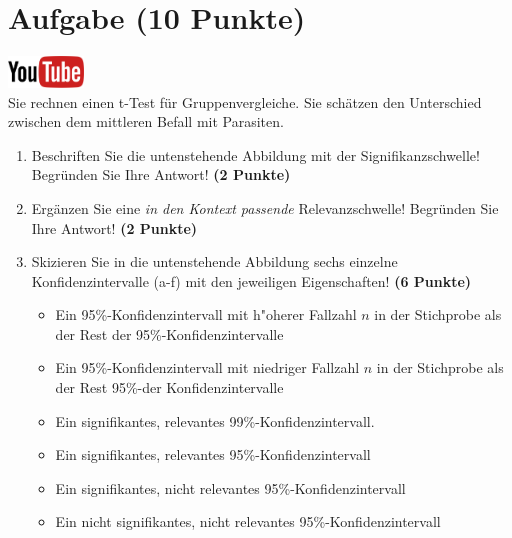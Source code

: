 \documentclass[a4paper, 10pt]{scrartcl}\usepackage[]{graphicx}\usepackage[]{xcolor}
\begin{document}
 
\clearpage

\section{Aufgabe \hfill (10 Punkte)}

\hfill\href{https://youtu.be/CN_O4fYPbhs}{\includegraphics[width =
  2cm]{img/youtube}}\\[1Ex]



Sie rechnen einen t-Test f{\"u}r Gruppenvergleiche. Sie sch{\"a}tzen den Unterschied
zwischen dem mittleren Befall mit Parasiten. 

\begin{enumerate}
\item Beschriften Sie die untenstehende Abbildung mit der
  Signifikanzschwelle! Begr{\"u}nden Sie Ihre Antwort! \textbf{(2 Punkte)}
\item Erg{\"a}nzen Sie eine \textit{in den Kontext passende} Relevanzschwelle!
  Begr{\"u}nden Sie Ihre Antwort! \textbf{(2 Punkte)} 
\item Skizieren Sie in die
  untenstehende Abbildung sechs einzelne Konfidenzintervalle (a-f) mit den
  jeweiligen Eigenschaften! \textbf{(6 Punkte)}
  \begin{itemize}
  \item[(a)] Ein 95\%-Konfidenzintervall mit h{"o}herer Fallzahl $n$ in der Stichprobe als der Rest der 95\%-Konfidenzintervalle 	
  \item[(b)] Ein 95\%-Konfidenzintervall mit niedriger Fallzahl $n$ in der Stichprobe als der Rest 95\%-der Konfidenzintervalle 	
  \item[(c)] Ein signifikantes, relevantes 99\%-Konfidenzintervall. 	
  \item[(d)] Ein signifikantes, relevantes 95\%-Konfidenzintervall 
  \item[(e)] Ein signifikantes, nicht relevantes 95\%-Konfidenzintervall
  \item[(f)] Ein nicht signifikantes, nicht relevantes 95\%-Konfidenzintervall
  \end{itemize}
\end{enumerate}
\end{document}
